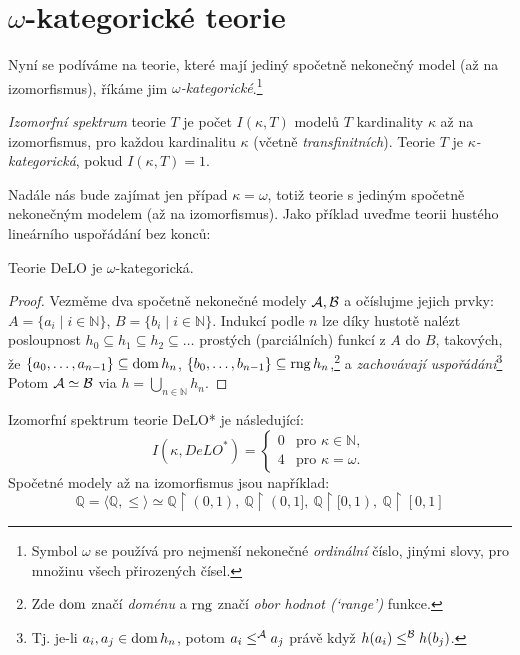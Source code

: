 \section{$\omega$-kategorické teorie}\label{section:categoricity}

Nyní se podíváme na teorie, které mají jediný spočetně nekonečný model (až na izomorfismus), říkáme jim \emph{$\omega$-kategorické}.\footnote{Symbol $\omega$ se používá pro nejmenší nekonečné \emph{ordinální} číslo, jinými slovy, pro množinu všech přirozených čísel.}

\begin{definition}
    \emph{Izomorfní spektrum} teorie $T$ je počet $
    I(\kappa,T)$ modelů $T$ kardinality $\kappa$ až na izomorfismus, pro každou kardinalitu $\kappa$ (včetně \emph{transfinitních}).     Teorie $T$ je \emph{$\kappa$-kategorická}, pokud $
    I(\kappa,T)=1$.
\end{definition}

Nadále nás bude zajímat jen případ $\kappa=\omega$, totiž teorie s jediným spočetně nekonečným modelem (až na izomorfismus). Jako příklad uveďme teorii hustého lineárního uspořádání bez konců:

\begin{proposition}
    Teorie DeLO je $\omega$-kategorická.
\end{proposition}
\begin{proof}
Vezměme dva spočetně nekonečné modely $\mathcal{A},\mathcal{B}$ a očíslujme jejich prvky: $A=\{a_i\mid i\in\mathbb N\}$, $B=\{b_i\mid i\in\mathbb N\}$. Indukcí podle $n$ lze díky hustotě nalézt posloupnost $h_0\subseteq h_1\subseteq h_2\subseteq\dots$ prostých (parciálních) funkcí z $A$ do $B$, takových, že $\{a_0,\dots,a_{n-1}\}\subseteq\operatorname{dom} h_n$, $\{b_0,\dots,b_{n-1}\}\subseteq\operatorname{rng} h_n$,\footnote{Zde $\operatorname{dom}$ značí \emph{doménu} a $\operatorname{rng}$ značí \emph{obor hodnot (`range')} funkce.} a \emph{zachovávají uspořádání}\footnote{Tj. je-li $a_i,a_j\in\operatorname{dom} h_n$, potom $a_i\leq^{\mathcal{A}} a_j$ právě když $h(a_i)\leq^{\mathcal{B}} h(b_j)$.} Potom $\mathcal{A}\simeq\mathcal{B}$ via $h=\bigcup_{n\in\mathbb N}h_n$.
\end{proof}

\begin{corollary}
Izomorfní spektrum teorie DeLO* je následující:
$$
I(\kappa,DeLO^*)=\begin{cases}
    0 &\text{pro }\kappa\in\mathbb{N},\\
    4 &\text{pro }\kappa=\omega.
\end{cases}
$$
Spočetné modely až na izomorfismus jsou například:
$$ 
\mathbb Q=\langle \mathbb Q,\leq\rangle\simeq\mathbb Q\upharpoonright(0,1), \ \mathbb Q\upharpoonright(0,1], \ \mathbb Q \upharpoonright [0,1), \ \mathbb Q \upharpoonright [0,1]
$$
\end{corollary}

